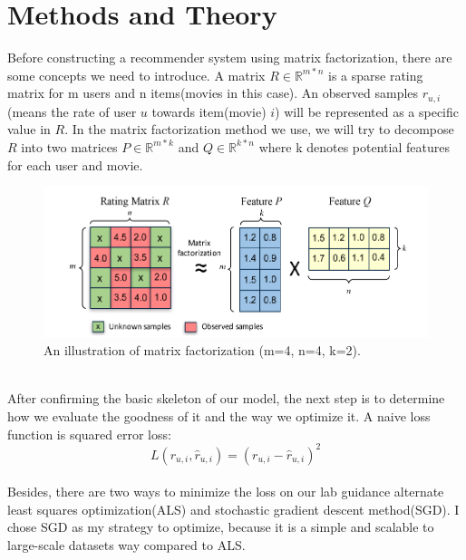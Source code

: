 \documentclass[journal, a4paper]{IEEEtran}
\begin{document}
\section{Methods and Theory}
Before constructing a recommender system using matrix factorization, there are some concepts we need to introduce. A matrix $R \in \mathbb{R} ^ {m*n}$ is a sparse rating matrix for m users and n items(movies in this case). An observed samples $r_{u,i}$ (means the rate of user $u$ towards item(movie) $i$) will be represented as a specific value in $R$. In the matrix factorization method we use, we will try to decompose $R$ into two matrices $P \in \mathbb{R} ^ {m*k}$ and $Q \in \mathbb{R} ^ {k*n}$ where k denotes potential features for each user and movie.
\begin{figure}[!hbt]
	\begin{center}
	\includegraphics[width=\columnwidth]{matrix_decompose.png}
	\caption{An illustration of matrix factorization (m=4, n=4, k=2).}
	\label{fig1}
	\end{center}
\end{figure}\\
After confirming the basic skeleton of our model, the next step is to determine how we evaluate the goodness of it and the way we optimize it. A naive loss function is squared error loss:
\begin{equation}
    L(r_{u,i},\hat{r}_{u,i}) = (r_{u,i}-\hat{r}_{u,i})^2
\end{equation}\\
Besides, there are two ways to minimize the loss on our lab guidance alternate least squares optimization(ALS) and stochastic gradient descent method(SGD). I chose SGD as my strategy to optimize, because it is a simple and scalable to large-scale datasets way compared to ALS.\\
\end{document}
